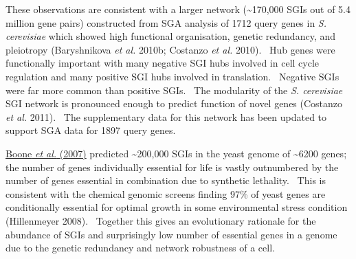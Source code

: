 These observations are consistent with a larger network (\~{}170,000 SGIs out of 5.4 million gene pairs) constructed from SGA analysis of 1712 query genes in \textit{S. cerevisiae} which showed high functional organisation, genetic redundancy, and pleiotropy (Baryshnikova\textit{ et al.} 2010b; Costanzo\textit{ et al.} 2010). \ Hub genes were functionally important with many negative SGI hubs involved in cell cycle regulation and many positive SGI hubs involved in translation. \ Negative SGIs were far more common than positive SGIs. \ The modularity of the \textit{S. cerevisiae} SGI network is pronounced enough to predict function of novel genes (Costanzo\textit{ et al.} 2011). \ The supplementary data for this network has been updated to support SGA data for 1897 query genes. \  

\hyperlink{ENREF15}{Boone}\hyperlink{ENREF15}{\textit{ et al.}}\hyperlink{ENREF15}{ (2007)} predicted \~{}200,000 SGIs in the yeast genome of \~{}6200 genes; the number of genes individually essential for life is vastly outnumbered by the number of genes essential in combination due to synthetic lethality. \ This is consistent with the chemical genomic screens finding 97\% of yeast genes are conditionally essential for optimal growth in some environmental stress condition (Hillenmeyer 2008). \ Together this gives an evolutionary rationale for the abundance of SGIs and surprisingly low number of essential genes in a genome due to the genetic redundancy and network robustness of a cell. \  

